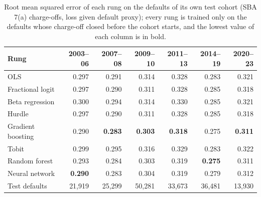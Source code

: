 \begin{table}[htbp]
\centering
\small
\caption{Root mean squared error of each rung on the defaults of its own test cohort (SBA 7(a) charge-offs, loss given default proxy); every rung is trained only on the defaults whose charge-off closed before the cohort starts, and the lowest value of each column is in bold.}
\label{tab:lgd-ead-rmse}
\begin{tabular}{lrrrrrr}
\toprule
Rung & 2003--06 & 2007--08 & 2009--10 & 2011--13 & 2014--19 & 2020--23 \\
\midrule
OLS & 0.297 & 0.291 & 0.314 & 0.328 & 0.283 & 0.321 \\
Fractional logit & 0.297 & 0.290 & 0.311 & 0.328 & 0.285 & 0.318 \\
Beta regression & 0.300 & 0.294 & 0.314 & 0.330 & 0.285 & 0.321 \\
Hurdle & 0.297 & 0.290 & 0.311 & 0.328 & 0.285 & 0.318 \\
Gradient boosting & 0.290 & \textbf{0.283} & \textbf{0.303} & \textbf{0.318} & 0.275 & \textbf{0.311} \\
Tobit & 0.299 & 0.295 & 0.316 & 0.329 & 0.283 & 0.322 \\
Random forest & 0.293 & 0.284 & 0.303 & 0.319 & \textbf{0.275} & 0.311 \\
Neural network & \textbf{0.290} & 0.283 & 0.304 & 0.319 & 0.279 & 0.312 \\
Test defaults & 21,919 & 25,299 & 50,281 & 33,673 & 36,481 & 13,930 \\
\bottomrule
\end{tabular}
\end{table}
